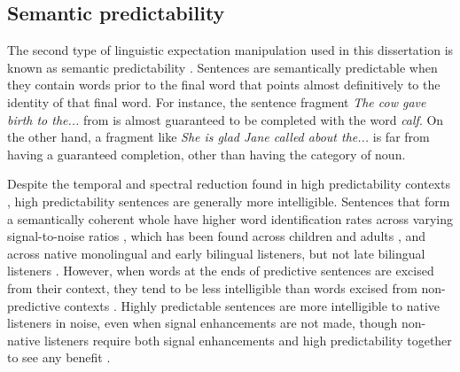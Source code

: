 \subsection{Semantic predictability}
\label{sec:semanticpredictability}

The second type of linguistic expectation manipulation used in this dissertation is known as semantic predictability \citep{Kalikow1977}.
Sentences are semantically predictable when they contain words prior to the final word that points almost definitively to the identity of that final word.  
For instance, the sentence fragment \emph{The cow gave birth to the...} from \citet{Kalikow1977} is almost guaranteed to be completed with the word \emph{calf}.  
On the other hand, a fragment like \emph{She is glad Jane called about the...} is far from having a guaranteed completion, other than having the category of noun.

Despite the temporal and spectral reduction found in high predictability contexts \cite{Scarborough2010, Clopper2008}, high predictability sentences are generally more intelligible.
Sentences that form a semantically coherent whole have higher word identification rates across varying signal-to-noise ratios \citep{Kalikow1977}, which has been found across children and adults \citep{Fallon2002}, and across native monolingual and early bilingual listeners, but not late bilingual listeners \citep{Mayo1997}.
However, when words at the ends of predictive sentences are excised from their context, they tend to be less intelligible than words excised from non-predictive contexts \citep{Lieberman1963}.
Highly predictable sentences are more intelligible to native listeners in noise, even when signal enhancements are not made, though non-native listeners require both signal enhancements and high predictability together to see any benefit \cite{Bradlow2007}.

